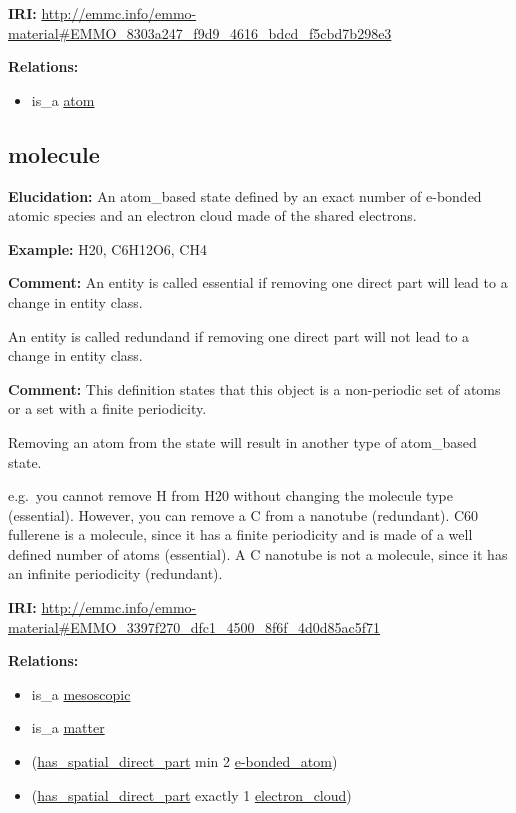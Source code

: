 \documentclass[a4paper,]{report}
\providecommand{\tightlist}{%
  \setlength{\itemsep}{0pt}\setlength{\parskip}{0pt}}
\begin{document}
\textbf{IRI:}
\url{http://emmc.info/emmo-material\#EMMO_8303a247_f9d9_4616_bdcd_f5cbd7b298e3}

\textbf{Relations:}

\begin{itemize}
\tightlist
\item
  is\_a \protect\hyperlink{atom}{atom}
\end{itemize}

\hypertarget{molecule-1}{%
\subsection{molecule}\label{molecule-1}}

\textbf{Elucidation:} An atom\_based state defined by an exact number of
e-bonded atomic species and an electron cloud made of the shared
electrons.

\textbf{Example:} H20, C6H12O6, CH4

\textbf{Comment:} An entity is called essential if removing one direct
part will lead to a change in entity class.

An entity is called redundand if removing one direct part will not lead
to a change in entity class.

\textbf{Comment:} This definition states that this object is a
non-periodic set of atoms or a set with a finite periodicity.

Removing an atom from the state will result in another type of
atom\_based state.

e.g.~you cannot remove H from H20 without changing the molecule type
(essential). However, you can remove a C from a nanotube (redundant).
C60 fullerene is a molecule, since it has a finite periodicity and is
made of a well defined number of atoms (essential). A C nanotube is not
a molecule, since it has an infinite periodicity (redundant).

\textbf{IRI:}
\url{http://emmc.info/emmo-material\#EMMO_3397f270_dfc1_4500_8f6f_4d0d85ac5f71}

\textbf{Relations:}

\begin{itemize}
\tightlist
\item
  is\_a \protect\hyperlink{mesoscopic}{mesoscopic}
\item
  is\_a \protect\hyperlink{matter}{matter}
\item
  (\protect\hyperlink{has_spatial_direct_part}{has\_spatial\_direct\_part}
  min 2 \protect\hyperlink{e-bonded_atom}{e-bonded\_atom})
\item
  (\protect\hyperlink{has_spatial_direct_part}{has\_spatial\_direct\_part}
  exactly 1 \protect\hyperlink{electron_cloud}{electron\_cloud})
\end{itemize}
\end{document}
